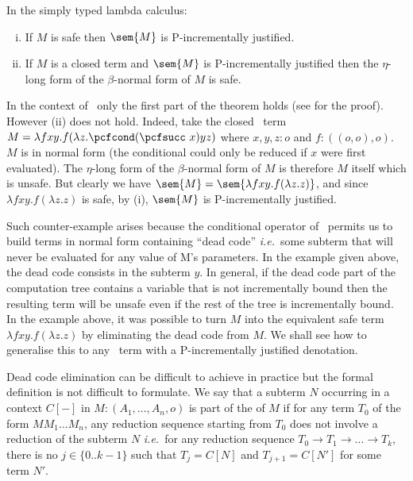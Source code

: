 \begin{theorem}
\label{thm:safeincrejust} In the simply typed lambda calculus:
\begin{enumerate}[(i)]
\item If $M$ is safe then $\sem{M}$ is P-incrementally justified.
\item If $M$ is a closed term and $\sem{M}$ is
  P-incrementally justified then the $\eta$-long form of the
  $\beta$-normal form of $M$ is safe.
\end{enumerate}
\end{theorem}

In the context of \pcf\, only the first part of the theorem holds (see \cite{blumtransfer} for the proof). However (ii) does not hold. Indeed, take the closed \pcf\ term $M = \lambda f x y. f (\lambda z. \pcfcond (\pcfsucc\ x) y z )$ where $x,y,z:o$ and $f:((o,o),o)$. $M$ is in normal form (the conditional  could  only be reduced if $x$ were first evaluated). The $\eta$-long form of the $\beta$-normal form of $M$ is therefore $M$ itself which is unsafe.
But clearly we have $\sem{M} = \sem{\lambda f x y. f (\lambda z. z)}$, and since  $\lambda f x y. f (\lambda z. z)$ is safe, by (i), $\sem{M}$ is P-incrementally justified.

Such counter-example arises because the conditional operator of \pcf\ permits us to build terms in normal form containing ``dead code'' {\it i.e.}~some subterm that will never be evaluated for any value of M's parameters. In the example given above, the dead code consists in the subterm $y$. In general, if the dead code part of the computation tree contains a variable that is not incrementally bound then the resulting term will be unsafe even if the rest of the tree is incrementally bound.
In the example above, it was possible to turn $M$ into the equivalent safe term $\lambda f x y. f (\lambda z. z)$ by eliminating the dead code from $M$.
We shall see how to generalise this to any \pcf\ term with a P-incrementally justified denotation.

Dead code elimination can be difficult to achieve in practice but the formal definition is not difficult to formulate. We say that a subterm $N$ occurring
in a context $C[-]$ in $M : (A_1, \ldots, A_n,o)$ is part of the  of $M$ if for any term $T_0$ of the form $M M_1 \ldots M_n$,
any reduction sequence starting from $T_0$ does not involve a reduction of the subterm $N$ {\it i.e.}~for any reduction sequence $T_0 \rightarrow T_1 \rightarrow \ldots \rightarrow T_k$, there is no $j\in \{0.. k-1\}$ such that $T_j = C[N]$ and $T_{j+1} = C[N']$ for some term $N'$.


